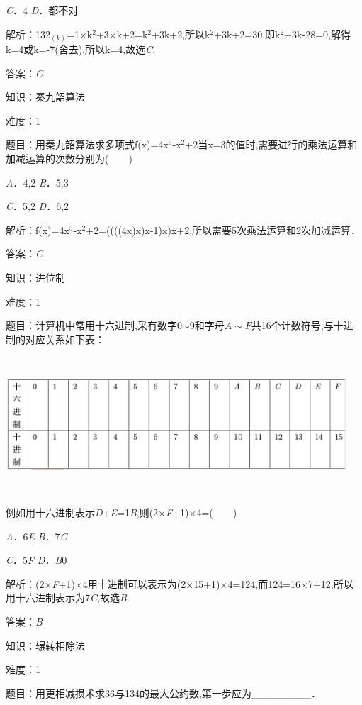 \documentclass{article} %
\begin{document}
\textit{C}．4        \textit{D}．都不对

解析：132${}_{(k)}$=1$\mathrm{\times}$k${}^{2}$+3$\mathrm{\times}$k+2=k${}^{2}$+3k+2,所以k${}^{2}$+3k+2=30,即k${}^{2}$+3k-28=0,解得k=4或k=-7(舍去),所以k=4,故选\textit{C}.

答案：\textit{C}

知识：秦九韶算法

难度：1

题目：用秦九韶算法求多项式f(x)=4x${}^{5}$-x${}^{2}$+2当x=3的值时,需要进行的乘法运算和加减运算的次数分别为(　　)

\textit{A}．4,2  \textit{B}．5,3

\textit{C}．5,2  \textit{D}．6,2

解析：f(x)=4x${}^{5}$-x${}^{2}$+2=((((4x)x)x-1)x)x+2,所以需要5次乘法运算和2次加减运算．

答案：\textit{C}

知识：进位制

难度：1

题目：计算机中常用十六进制,采有数字0$\sim$9和字母$A\sim F$共16个计数符号,与十进制的对应关系如下表：

\includegraphics*[width=5in, height=2in, keepaspectratio=false]{image114}

例如用十六进制表示\textit{D}+\textit{E}=1\textit{B},则(2$\mathrm{\times}$\textit{F}+1)$\mathrm{\times}$4=(　　)

\textit{A}．6\textit{E}  \textit{B}．7\textit{C}

\textit{C}．5\textit{F}  \textit{D}．\textit{B}0

解析：(2$\mathrm{\times}$\textit{F}+1)$\mathrm{\times}$4用十进制可以表示为(2$\mathrm{\times}$15+1)$\mathrm{\times}$4=124,而124=16$\mathrm{\times}$7+12,所以用十六进制表示为7\textit{C},故选\textit{B}.

答案：\textit{B}



知识：辗转相除法

难度：1

题目：用更相减损术求36与134的最大公约数,第一步应为\_\_\_\_\_\_\_\_．
\end{document}
